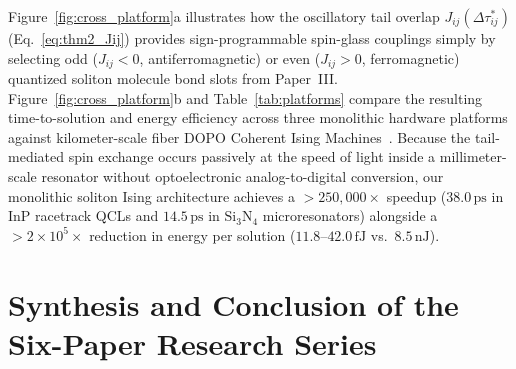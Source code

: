 \documentclass[11pt,letterpaper]{article}
\begin{document}
Figure~\ref{fig:cross_platform}a illustrates how the oscillatory tail overlap $J_{ij}(\Delta\tau_{ij}^*)$ (Eq.~\eqref{eq:thm2_Jij}) provides sign-programmable spin-glass couplings simply by selecting odd ($J_{ij} < 0$, antiferromagnetic) or even ($J_{ij} > 0$, ferromagnetic) quantized soliton molecule bond slots from Paper~III. Figure~\ref{fig:cross_platform}b and Table~\ref{tab:platforms} compare the resulting time-to-solution and energy efficiency across three monolithic hardware platforms against kilometer-scale fiber DOPO Coherent Ising Machines~\cite{Inagaki2016,McMahon2016,Yamamoto2017}. Because the tail-mediated spin exchange occurs passively at the speed of light inside a millimeter-scale resonator without optoelectronic analog-to-digital conversion, our monolithic soliton Ising architecture achieves a $>250{,}000\times$ speedup ($38.0\,\mathrm{ps}$ in InP racetrack QCLs and $14.5\,\mathrm{ps}$ in $\mathrm{Si_3N_4}$ microresonators) alongside a $>2\times 10^5\times$ reduction in energy per solution ($11.8\text{--}42.0\,\mathrm{fJ}$ vs.\ $8.5\,\mathrm{nJ}$).

\section{Synthesis and Conclusion of the Six-Paper Research Series}
\label{sec:conclusion}
\end{document}

